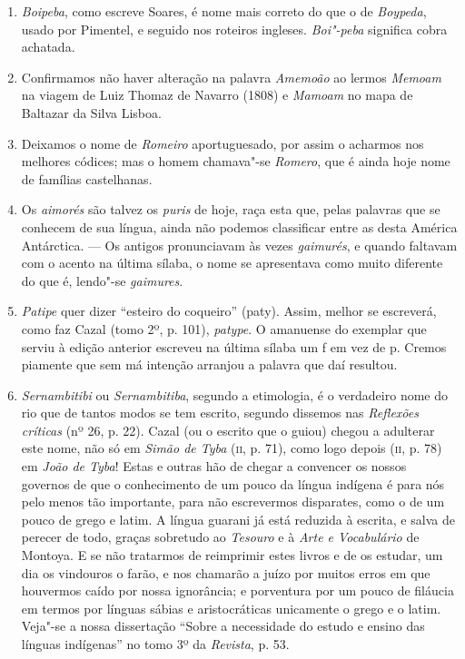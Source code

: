 \begin{enumerate}
\item \textit{Boipeba}, como escreve Soares, é nome mais correto do que o de \textit{Boypeda}, usado por 
Pimentel, e seguido nos roteiros ingleses. \textit{Boi"-peba} significa cobra achatada.

\item Confirmamos não haver alteração na palavra \textit{Amemoão} ao lermos \textit{Memoam} na 
viagem de Luiz Thomaz de Navarro (1808) e \textit{Mamoam} no mapa de  Baltazar da 
Silva Lisboa.

\item Deixamos o nome de \textit{Romeiro} aportuguesado, por assim o acharmos nos melhores 
códices; mas o homem chamava"-se \textit{Romero}, que é ainda hoje nome de famílias 
castelhanas.

\item Os \textit{aimorés} são talvez os \textit{puris} de hoje, raça esta que, pelas palavras que se 
conhecem de sua língua, ainda não podemos classificar entre as desta América 
Antárctica. --- Os antigos pronunciavam às vezes \textit{gaimurés}, e quando faltavam com o 
acento na última sílaba, o nome se apresentava como muito diferente do que é, 
lendo"-se \textit{gaimures}.

\item \textit{Patipe} quer dizer ``esteiro do coqueiro'' (paty). Assim, melhor se escreverá, como 
faz Cazal (tomo 2º, p. 101), \textit{patype}. O amanuense do exemplar que serviu à edição 
anterior escreveu na última sílaba um f em vez de p. Cremos piamente que sem má intenção arranjou a palavra que daí resultou.

\item  \textit{Sernambitibi} ou \textit{Sernambitiba}, segundo a etimologia, é o verdadeiro nome do rio 
que de tantos modos se tem escrito, segundo dissemos nas \textit{Reflexões críticas} (nº 26, p. 
22). Cazal (ou o escrito que o guiou) chegou a adulterar este nome, não só em 
\textit{Simão de Tyba} (\textsc{ii}, p. 71), como logo depois (\textsc{ii}, p. 78) em \textit{João de Tyba}! Estas e outras hão de 
chegar a convencer os nossos governos de que o conhecimento de um pouco da língua 
indígena é para nós pelo menos tão importante, para não escrevermos disparates, como 
o de um pouco de grego e latim. A língua guarani já está reduzida à escrita, e salva de 
perecer de todo, graças sobretudo ao \textit{Tesouro} e à \textit{Arte e Vocabulário} de Montoya. E se 
não tratarmos de reimprimir estes livros e de os estudar, um dia os vindouros o farão, e 
nos chamarão a juízo por muitos erros em que houvermos caído por nossa ignorância; e 
porventura por um pouco de filáucia em termos por línguas sábias e aristocráticas 
unicamente o grego e o latim. Veja"-se a nossa dissertação ``Sobre a necessidade do 
estudo e ensino das línguas indígenas'' no tomo 3º da \textit{Revista}, p. 53.


\end{enumerate}
